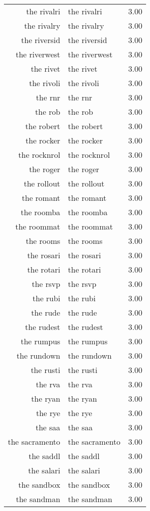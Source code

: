 \begin{table}[ht]
\begin{tabular}{rlr}
  the rivalri & the rivalri & 3.00 \\ 
  the rivalry & the rivalry & 3.00 \\ 
  the riversid & the riversid & 3.00 \\ 
  the riverwest & the riverwest & 3.00 \\ 
  the rivet & the rivet & 3.00 \\ 
  the rivoli & the rivoli & 3.00 \\ 
  the rnr & the rnr & 3.00 \\ 
  the rob & the rob & 3.00 \\ 
  the robert & the robert & 3.00 \\ 
  the rocker & the rocker & 3.00 \\ 
  the rocknrol & the rocknrol & 3.00 \\ 
  the roger & the roger & 3.00 \\ 
  the rollout & the rollout & 3.00 \\ 
  the romant & the romant & 3.00 \\ 
  the roomba & the roomba & 3.00 \\ 
  the roommat & the roommat & 3.00 \\ 
  the rooms & the rooms & 3.00 \\ 
  the rosari & the rosari & 3.00 \\ 
  the rotari & the rotari & 3.00 \\ 
  the rsvp & the rsvp & 3.00 \\ 
  the rubi & the rubi & 3.00 \\ 
  the rude & the rude & 3.00 \\ 
  the rudest & the rudest & 3.00 \\ 
  the rumpus & the rumpus & 3.00 \\ 
  the rundown & the rundown & 3.00 \\ 
  the rusti & the rusti & 3.00 \\ 
  the rva & the rva & 3.00 \\ 
  the ryan & the ryan & 3.00 \\ 
  the rye & the rye & 3.00 \\ 
  the saa & the saa & 3.00 \\ 
  the sacramento & the sacramento & 3.00 \\ 
  the saddl & the saddl & 3.00 \\ 
  the salari & the salari & 3.00 \\ 
  the sandbox & the sandbox & 3.00 \\ 
  the sandman & the sandman & 3.00 \\ 

\end{tabular}
\end{table}
